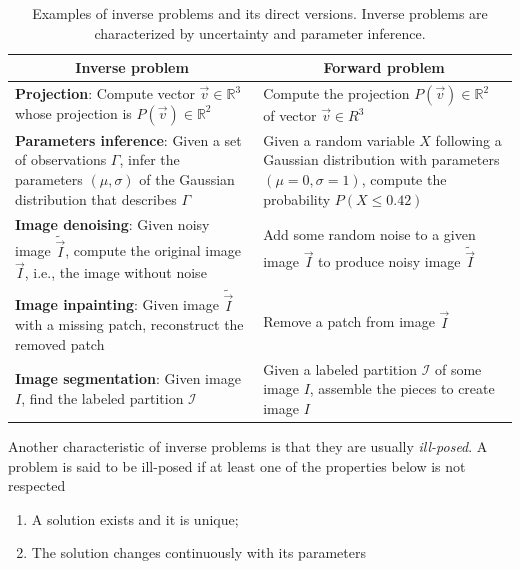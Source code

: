 \begin{table}
\renewcommand{\arraystretch}{1.5}
\footnotesize
\begin{tabular}{|m{7cm}|m{7cm}|}
\hline
\multicolumn{1}{|c|}{\textbf{Inverse problem}} & \multicolumn{1}{c|}{\textbf{Forward problem}} \\
\hline
\textbf{Projection}: Compute vector $\vec{v} \in \mathbb{R}^3$ whose projection is $P(\vec{v}) \in \mathbb{R}^2$ & Compute the projection $P(\vec{v}) \in \mathbb{R}^2$ of vector $\vec{v} \in R^3$\\
\hline
\textbf{Parameters inference}: Given a set of observations $\Gamma$, infer the parameters $(\mu,\sigma)$ of the Gaussian distribution that describes $\Gamma$ & Given a random variable $X$ following a Gaussian distribution with parameters $(\mu=0,\sigma=1)$, compute the probability $P(X \leq 0.42)$\\
\hline
\textbf{Image denoising}: Given noisy image $\widetilde{\vec{I}}$, compute the original image $\vec{I}$, i.e., the image without noise & Add some random noise to a given image $\vec{I}$ to produce noisy image $\widetilde{\vec{I}}$\\
\hline
\textbf{Image inpainting}: Given image $\widetilde{\vec{I}}$ with a missing patch, reconstruct the removed patch & Remove a patch from image $\vec{I}$ \\
\hline
\textbf{Image segmentation}: Given image $I$, find the labeled partition $\mathcal{I}$ & Given a labeled partition $\mathcal{I}$ of some image $I$, assemble the pieces to create image $I$\\
\hline
\end{tabular}
\caption{Examples of inverse problems and its direct versions. Inverse problems are characterized by uncertainty and parameter inference. }
\label{ch1:tab:inverse-problems-list}
\end{table}


Another characteristic of inverse problems is that they are usually \emph{ill-posed}. A problem is said to be ill-posed if at least one of the properties below is not respected

\begin{enumerate}
\item{A solution exists and it is unique;}
\item{The solution changes continuously with its parameters}
\end{enumerate}



